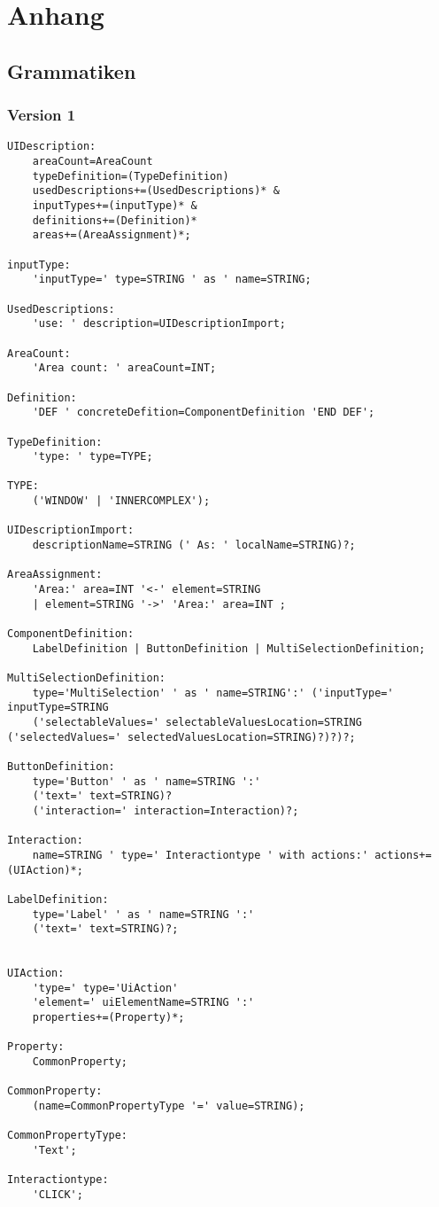 \chapter{Anhang}
\section*{Grammatiken}\label{AppGrammatiken}
\subsection*{Version 1}
\begin{lstlisting}
UIDescription:
	areaCount=AreaCount
	typeDefinition=(TypeDefinition)
	usedDescriptions+=(UsedDescriptions)* &
	inputTypes+=(inputType)* &
	definitions+=(Definition)*
	areas+=(AreaAssignment)*;

inputType:
	'inputType=' type=STRING ' as ' name=STRING;

UsedDescriptions:
	'use: ' description=UIDescriptionImport;

AreaCount:
	'Area count: ' areaCount=INT;

Definition:
	'DEF ' concreteDefition=ComponentDefinition 'END DEF';

TypeDefinition:
	'type: ' type=TYPE;

TYPE:
	('WINDOW' | 'INNERCOMPLEX');

UIDescriptionImport:
	descriptionName=STRING (' As: ' localName=STRING)?;

AreaAssignment:
	'Area:' area=INT '<-' element=STRING
	| element=STRING '->' 'Area:' area=INT ;

ComponentDefinition:
	LabelDefinition | ButtonDefinition | MultiSelectionDefinition;

MultiSelectionDefinition:
	type='MultiSelection' ' as ' name=STRING':' ('inputType=' inputType=STRING
	('selectableValues=' selectableValuesLocation=STRING ('selectedValues=' selectedValuesLocation=STRING)?)?)?;

ButtonDefinition:
	type='Button' ' as ' name=STRING ':'
	('text=' text=STRING)?
	('interaction=' interaction=Interaction)?;

Interaction:
	name=STRING ' type=' Interactiontype ' with actions:' actions+=(UIAction)*;

LabelDefinition:
	type='Label' ' as ' name=STRING ':'
	('text=' text=STRING)?;


UIAction:
	'type=' type='UiAction'
	'element=' uiElementName=STRING ':'
	properties+=(Property)*;

Property:
	CommonProperty;

CommonProperty:
	(name=CommonPropertyType '=' value=STRING);

CommonPropertyType:
	'Text';

Interactiontype:
	'CLICK';
\end{lstlisting}

